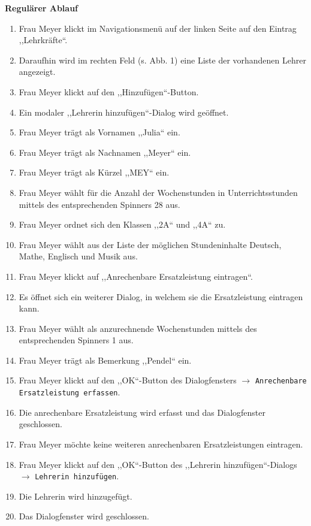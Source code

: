 \documentclass[fontsize=12pt,paper=a4,twoside]{scrartcl}
\begin{document}
\textbf{Regulärer Ablauf}
\begin{enumerate}
\item Frau Meyer klickt im Navigationsmenü auf der linken Seite auf den Eintrag ,,Lehrkr\"afte``.
\item Daraufhin wird im rechten Feld (s. Abb. 1) eine Liste der vorhandenen Lehrer angezeigt.
\item Frau Meyer klickt auf den ,,Hinzufügen``-Button.
\item Ein modaler ,,Lehrerin hinzufügen``-Dialog wird geöffnet.
\item Frau Meyer trägt als Vornamen ,,Julia`` ein.
\item Frau Meyer trägt als Nachnamen ,,Meyer`` ein.
\item Frau Meyer trägt als Kürzel ,,MEY`` ein.
\item Frau Meyer wählt für die Anzahl der Wochenstunden in Unterrichtsstunden mittels des entsprechenden Spinners 28 aus.
\item Frau Meyer ordnet sich den Klassen ,,2A`` und ,,4A`` zu.
\item Frau Meyer wählt aus der Liste der möglichen Stundeninhalte Deutsch, Mathe, Englisch und Musik aus.
\item Frau Meyer klickt auf ,,Anrechenbare Ersatzleistung eintragen``.
\item Es öffnet sich ein weiterer Dialog, in welchem sie die Ersatzleistung eintragen kann.
\item Frau Meyer wählt als anzurechnende Wochenstunden mittels des entsprechenden Spinners 1 aus.
\item Frau Meyer trägt als Bemerkung ,,Pendel`` ein.
\item Frau Meyer klickt auf den ,,OK``-Button des Dialogfensters $\rightarrow$ \texttt{Anrechenbare Ersatzleistung erfassen}.
\item Die anrechenbare Ersatzleistung wird erfasst und das Dialogfenster geschlossen.
\item Frau Meyer möchte keine weiteren anrechenbaren Ersatzleistungen eintragen.
\item Frau Meyer klickt auf den ,,OK``-Button des ,,Lehrerin hinzufügen``-Dialogs $\rightarrow$ \texttt{Lehrerin hinzufügen}.
\item Die Lehrerin wird hinzugefügt.
\item Das Dialogfenster wird geschlossen.
\end{enumerate}
\vspace{5pt}
\end{document}
